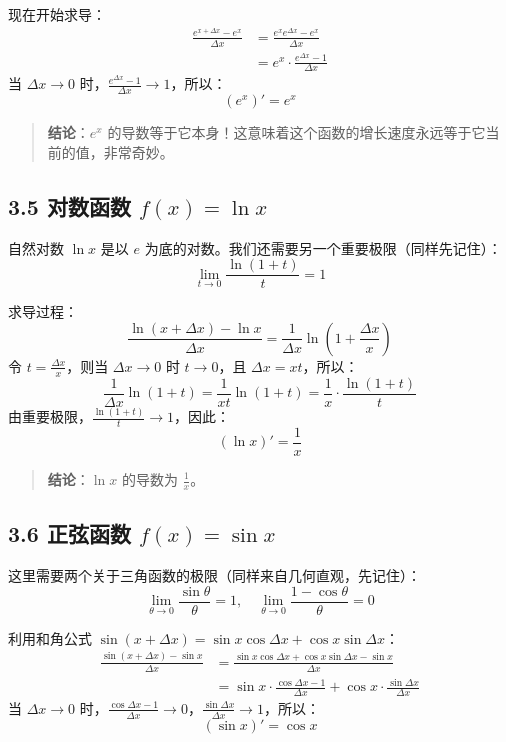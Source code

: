 \documentclass[10pt]{article}
\begin{document}
现在开始求导：
\[
\begin{aligned}
\frac{e^{x+\Delta x} - e^x}{\Delta x} &= \frac{e^x e^{\Delta x} - e^x}{\Delta x} \\
&= e^x \cdot \frac{e^{\Delta x} - 1}{\Delta x}
\end{aligned}
\]
当 $\Delta x \to 0$ 时，$\frac{e^{\Delta x} - 1}{\Delta x} \to 1$，所以：
\[
(e^x)' = e^x
\]

\begin{quote}
\textbf{结论}：$e^x$ 的导数等于它本身！这意味着这个函数的增长速度永远等于它当前的值，非常奇妙。
\end{quote}

\subsection*{3.5 对数函数 $f(x) = \ln x$}
自然对数 $\ln x$ 是以 $e$ 为底的对数。我们还需要另一个重要极限（同样先记住）：
\[
\lim_{t \to 0} \frac{\ln(1+t)}{t} = 1
\]

求导过程：
\[
\frac{\ln(x+\Delta x) - \ln x}{\Delta x} = \frac{1}{\Delta x} \ln\left(1 + \frac{\Delta x}{x}\right)
\]
令 $t = \frac{\Delta x}{x}$，则当 $\Delta x \to 0$ 时 $t \to 0$，且 $\Delta x = x t$，所以：
\[
\frac{1}{\Delta x} \ln(1+t) = \frac{1}{x t} \ln(1+t) = \frac{1}{x} \cdot \frac{\ln(1+t)}{t}
\]
由重要极限，$\frac{\ln(1+t)}{t} \to 1$，因此：
\[
(\ln x)' = \frac{1}{x}
\]

\begin{quote}
\textbf{结论}：$\ln x$ 的导数为 $\frac{1}{x}$。
\end{quote}

\subsection*{3.6 正弦函数 $f(x) = \sin x$}
这里需要两个关于三角函数的极限（同样来自几何直观，先记住）：
\[
\lim_{\theta \to 0} \frac{\sin\theta}{\theta} = 1, \quad \lim_{\theta \to 0} \frac{1-\cos\theta}{\theta} = 0
\]

利用和角公式 $\sin(x+\Delta x) = \sin x \cos\Delta x + \cos x \sin\Delta x$：
\[
\begin{aligned}
\frac{\sin(x+\Delta x) - \sin x}{\Delta x} &= \frac{\sin x \cos\Delta x + \cos x \sin\Delta x - \sin x}{\Delta x} \\
&= \sin x \cdot \frac{\cos\Delta x - 1}{\Delta x} + \cos x \cdot \frac{\sin\Delta x}{\Delta x}
\end{aligned}
\]
当 $\Delta x \to 0$ 时，$\frac{\cos\Delta x - 1}{\Delta x} \to 0$，$\frac{\sin\Delta x}{\Delta x} \to 1$，所以：
\[
(\sin x)' = \cos x
\]
\end{document}
